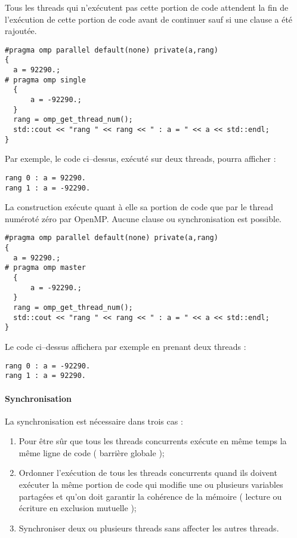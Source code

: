 \documentclass[fleqn,11pt]{article}
\begin{document}
Tous les threads qui n'exécutent pas cette portion de code attendent la fin
de l'exécution de cette portion de code avant de continuer sauf si une clause
\verb@nowait@ a été rajoutée.

\begin{lstlisting}
#pragma omp parallel default(none) private(a,rang)
{
  a = 92290.;
# pragma omp single
  {
      a = -92290.;
  }
  rang = omp_get_thread_num();
  std::cout << "rang " << rang << " : a = " << a << std::endl;
}
\end{lstlisting}

Par exemple, le code ci--dessus, exécuté sur deux threads, pourra afficher  :
\begin{verbatim}
rang 0 : a = 92290.
rang 1 : a = -92290.
\end{verbatim}

La construction \verb@master@ exécute quant à elle sa portion de code
que par le thread numéroté zéro par OpenMP. Aucune clause ou synchronisation
est possible.
\begin{lstlisting}
#pragma omp parallel default(none) private(a,rang)
{
  a = 92290.;
# pragma omp master
  {
      a = -92290.;
  }
  rang = omp_get_thread_num();
  std::cout << "rang " << rang << " : a = " << a << std::endl;
}
\end{lstlisting}

Le code ci--dessus affichera par exemple en prenant
deux threads :
\begin{verbatim}
rang 0 : a = -92290.
rang 1 : a = 92290.
\end{verbatim}

\paragraph{Synchronisation}

La synchronisation est nécessaire dans trois cas :
\begin{enumerate}
 \item Pour être sûr que tous les threads concurrents exécute en même temps
 la même ligne de code ( barrière globale );
 \item Ordonner l'exécution de tous les threads concurrents quand ils doivent
 exécuter la même portion de code qui modifie une ou plusieurs variables partagées
 et qu'on doit garantir la cohérence de la mémoire ( lecture ou écriture en
 exclusion mutuelle );
 \item Synchroniser deux ou plusieurs threads sans affecter les autres threads.
\end{enumerate}
\end{document}
